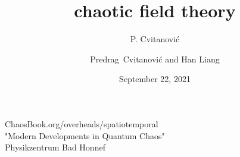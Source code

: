 
\date{September 22, 2021}


                        \newif\ifboyscout\boyscouttrue          %
                        \newif\ifsubmission\submissionfalse     %
                        \newif\ifblog\blogfalse %


\usepackage[font=scriptsize, labelfont=bf]{caption}
\usepackage[
    backend=biber,  %
    sorting=nyt,
    style=numeric, %
    natbib=true,
    style=phys, %
    biblabel= brackets, %
    articletitle=false, %
    pageranges = true , %
    sortlocale=en_US,
    firstinits=true,
    url=false, %
    doi=false, %
    eprint=false
]{biblatex}



\renewcommand{\Ssym}[1]{{\ensuremath{m_{#1}}}}    %


\title{
{\huge chaotic field theory} %
}
\author{P. Cvitanovi\'c}
\author[Cvitanovi\'c]
{
  \textcolor{green!50!black}{
  {Predrag~Cvitanovi\'c
     and
    Han Liang
  }	%
  }
}
\institute
{
 {ChaosBook.org/overheads/spatiotemporal}
 \\ \bigskip
    "Modern Developments in Quantum Chaos"
 \\
                Physikzentrum Bad Honnef
 }

